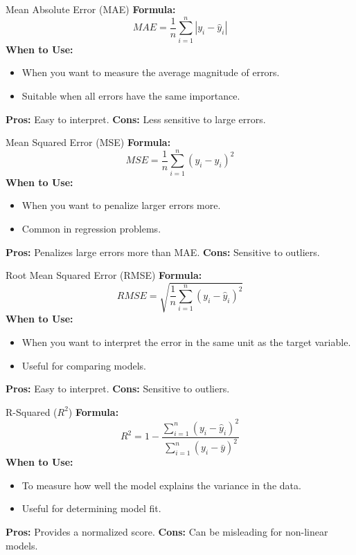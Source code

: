 \documentclass[serif, aspectratio=169]{beamer}
\begin{document}
\begin{frame}{Mean Absolute Error (MAE)}
\textbf{Formula:}
\begin{equation}
MAE = \frac{1}{n} \sum_{i=1}^{n} |y_i - \hat{y}_i|
\end{equation}
\textbf{When to Use:}
\begin{itemize}
    \item When you want to measure the average magnitude of errors.
    \item Suitable when all errors have the same importance.
\end{itemize}
\textbf{Pros:} Easy to interpret.
\textbf{Cons:} Less sensitive to large errors.
\end{frame}

\begin{frame}{Mean Squared Error (MSE)}
\textbf{Formula:}
\begin{equation}
MSE = \frac{1}{n} \sum_{i=1}^{n} (y_i - \hat{y}_i)^2
\end{equation}
\textbf{When to Use:}
\begin{itemize}
    \item When you want to penalize larger errors more.
    \item Common in regression problems.
\end{itemize}
\textbf{Pros:} Penalizes large errors more than MAE.
\textbf{Cons:} Sensitive to outliers.
\end{frame}

\begin{frame}{Root Mean Squared Error (RMSE)}
\textbf{Formula:}
\begin{equation}
RMSE = \sqrt{\frac{1}{n} \sum_{i=1}^{n} (y_i - \hat{y}_i)^2}
\end{equation}
\textbf{When to Use:}
\begin{itemize}
    \item When you want to interpret the error in the same unit as the target variable.
    \item Useful for comparing models.
\end{itemize}
\textbf{Pros:} Easy to interpret.
\textbf{Cons:} Sensitive to outliers.
\end{frame}

\begin{frame}{R-Squared ($R^2$)}
\textbf{Formula:}
\begin{equation}
R^2 = 1 - \frac{\sum_{i=1}^{n} (y_i - \hat{y}_i)^2}{\sum_{i=1}^{n} (y_i - \bar{y})^2}
\end{equation}
\textbf{When to Use:}
\begin{itemize}
    \item To measure how well the model explains the variance in the data.
    \item Useful for determining model fit.
\end{itemize}
\textbf{Pros:} Provides a normalized score.
\textbf{Cons:} Can be misleading for non-linear models.
\end{frame}
\end{document}
